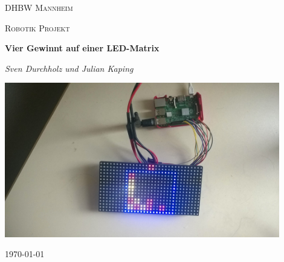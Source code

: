 \documentclass[
    12pt,										%
    a4paper,									%
    parskip 	= half,							%
    listof		= totoc,						%
    bibliography= totoc,						%
    version 	= last,							%
	numbers		= noenddot,
]{article}										%
\begin{document}
\begin{titlepage}
	\centering
	{\scshape\LARGE DHBW Mannheim \par}
	\vspace{1cm}
	{\scshape\Large Robotik Projekt\par}
	\vspace{1.5cm}
	{\huge\bfseries Vier Gewinnt auf einer LED-Matrix\par}
	\vspace{2cm}
	{\Large\itshape Sven Durchholz und Julian Kaping\par}
	\vspace{1cm}
	\includegraphics[width=0.9\textwidth]{inAction.jpg}\par\vspace{1cm}
	\vfill

	{\large \today\par}
\end{titlepage}
	
	\onehalfspacing
	
	
	
	
	\setcounter{page}{8} 						%

	\printbibliography 								%
	
	\appendix
	
	
\end{document}
